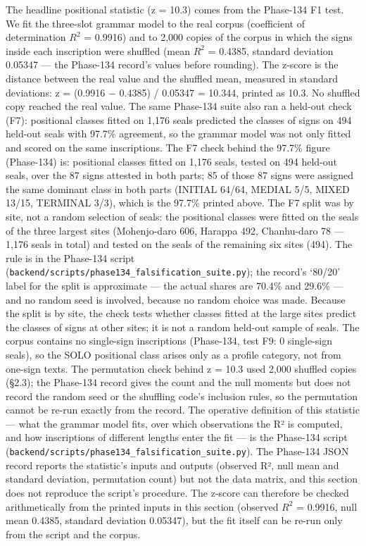 \documentclass[
]{article}
\begin{document}
The headline positional statistic (z = 10.3) comes from the Phase-134 F1 test. We fit the three-slot grammar model to the real corpus (coefficient of determination $R^2$ = 0.9916) and to 2,000 copies of the corpus in which the signs inside each inscription were shuffled (mean $R^2$ = 0.4385, standard deviation 0.05347 --- the Phase-134 record's values before rounding). The z-score is the distance between the real value and the shuffled mean, measured in standard deviations: z = (0.9916 $-$ 0.4385) / 0.05347 = 10.344, printed as 10.3. No shuffled copy reached the real value. The same Phase-134 suite also ran a held-out check (F7): positional classes fitted on 1,176 seals predicted the classes of signs on 494 held-out seals with 97.7\% agreement, so the grammar model was not only fitted and scored on the same inscriptions. The F7 check behind the 97.7\% figure (Phase-134) is: positional classes fitted on 1,176 seals, tested on 494 held-out seals, over the 87 signs attested in both parts; 85 of those 87 signs were assigned the same dominant class in both parts (INITIAL 64/64, MEDIAL 5/5, MIXED 13/15, TERMINAL 3/3), which is the 97.7\% printed above. The F7 split was by site, not a random selection of seals: the positional classes were fitted on the seals of the three largest sites (Mohenjo-daro 606, Harappa 492, Chanhu-daro 78 --- 1,176 seals in total) and tested on the seals of the remaining six sites (494). The rule is in the Phase-134 script (\texttt{backend/scripts/phase134\_falsification\_suite.py}); the record's `80/20' label for the split is approximate --- the actual shares are 70.4\% and 29.6\% --- and no random seed is involved, because no random choice was made. Because the split is by site, the check tests whether classes fitted at the large sites predict the classes of signs at other sites; it is not a random held-out sample of seals. The corpus contains no single-sign inscriptions (Phase-134, test F9: 0 single-sign seals), so the SOLO positional class arises only as a profile category, not from one-sign texts. The permutation check behind z = 10.3 used 2,000 shuffled copies (§2.3); the Phase-134 record gives the count and the null moments but does not record the random seed or the shuffling code's inclusion rules, so the permutation cannot be re-run exactly from the record. The operative definition of this statistic --- what the grammar model fits, over which observations the R² is computed, and how inscriptions of different lengths enter the fit --- is the Phase-134 script (\texttt{backend/scripts/phase134\_falsification\_suite.py}). The Phase-134 JSON record reports the statistic's inputs and outputs (observed R², null mean and standard deviation, permutation count) but not the data matrix, and this section does not reproduce the script's procedure. The z-score can therefore be checked arithmetically from the printed inputs in this section (observed $R^2$ = 0.9916, null mean 0.4385, standard deviation 0.05347), but the fit itself can be re-run only from the script and the corpus.
\end{document}
